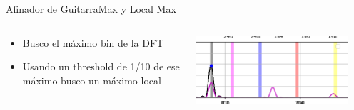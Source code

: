 \begin{frame}[t]{Afinador de Guitarra}{Max y Local Max}
   \footnotesize
   \begin{columns}
      \begin{column}{.5\textwidth}
         \begin{itemize}
            \item{Busco el máximo bin de la DFT}
            \item{Usando un threshold de 1/10 de ese máximo busco un máximo local}
         \end{itemize}
      
      \end{column}
      \begin{column}{.5\textwidth}
         \includegraphics[width=0.9\textwidth]{7_clase/local_max}
      \end{column}
   \end{columns}
   \vfill
   \note{
      \begin{itemize}
         \item{}
         \item{}
      \end{itemize}
   }
\end{frame}
